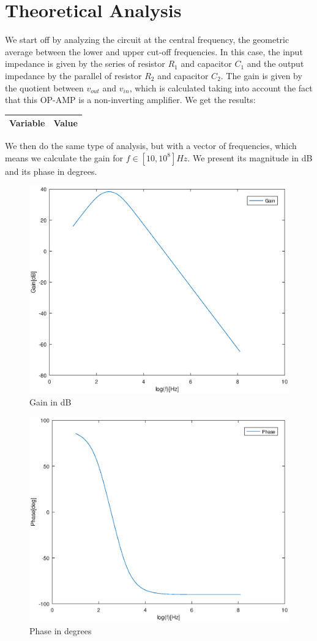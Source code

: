 \section{Theoretical Analysis}
\label{sec:analysis}

We start off by analyzing the circuit at the central frequency, the geometric average between the lower and upper cut-off frequencies. In this case, the input impedance is given by the series of resistor $R_1$ and capacitor $C_1$ and the output impedance by the parallel of resistor $R_2$ and capacitor $C_2$. The gain is given by the quotient between $v_{out}$ and $v_{in}$, which is calculated taking into account the fact that this OP-AMP is a non-inverting amplifier. We get the results:

\begin{center}
\begin{tabular}{|l|r|}
  \hline    
  {\bf Variable} & {\bf Value} \\ \hline
  
\end{tabular}
\end{center}

We then do the same type of analysis, but with a vector of frequencies, which means we calculate the gain for $f \in [10, 10^8] Hz$. We present its magnitude in dB and its phase in degrees.

\begin{figure}[H] \centering
\includegraphics[width=0.5\linewidth]{gainteo.eps}
\caption{Gain in dB}
\label{fig:gainteo}
\end{figure}

\begin{figure}[H] \centering
\includegraphics[width=0.5\linewidth]{phaseteo.eps}
\caption{Phase in degrees}
\label{fig:phaseteo}
\end{figure}